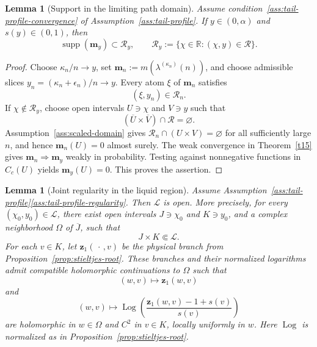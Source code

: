 \documentclass[11pt]{amsart}
\theoremstyle{plain}
\newtheorem{lemma}[theorem]{Lemma}
\numberwithin{equation}{section}
\numberwithin{theorem}{section}
\numberwithin{figure}{section}
\begin{document}
\begin{lemma}[Support in the limiting path domain]
\label{lem:limit-measure-domain-support}
Assume condition~\ref{ass:tail-profile-convergence} of
Assumption~\ref{ass:tail-profile}. If \(y\in(0,\alpha)\) and
\(s(y)\in(0,1)\), then
\[
    \operatorname{supp}(\mathbf m_y)\subset\mathcal R_y,
    \qquad
    \mathcal R_y:=\{\chi\in\mathbb R:(\chi,y)\in\mathcal R\}.
\]
\end{lemma}

\begin{proof}
Choose \(\kappa_n/n\to y\), set
\(\mathbf m_n:=m(\lambda^{(\kappa_n)}(n))\), and choose admissible
slices \(y_n=(\kappa_n+\epsilon_n)/n\to y\). Every atom \(\xi\) of
\(\mathbf m_n\) satisfies
\[
    (\xi,y_n)\in\mathcal R_n.
\]
If \(\chi\notin\mathcal R_y\), choose open intervals \(U\ni\chi\)
and \(V\ni y\) such that
\[
    (\overline U\times\overline V)\cap\mathcal R=\varnothing.
\]
Assumption~\ref{ass:scaled-domain} gives
\(\mathcal R_n\cap(U\times V)=\varnothing\) for all sufficiently
large \(n\), and hence \(\mathbf m_n(U)=0\) almost surely.
The weak convergence in Theorem~\ref{t15} gives
\(\mathbf m_n\Rightarrow\mathbf m_y\) weakly in probability.
Testing against nonnegative functions in \(C_c(U)\) yields
\(\mathbf m_y(U)=0\). This proves the assertion.
\end{proof}

\begin{lemma}[Joint regularity in the liquid region]
\label{lem:joint-liquid-regularity}
Assume
Assumption~\ref{ass:tail-profile}\ref{ass:tail-profile-regularity}.
Then \(\mathcal L\) is open. More precisely, for every
\((\chi_0,y_0)\in\mathcal L\), there exist open intervals
\(J\ni\chi_0\) and \(K\ni y_0\), and a complex neighborhood
\(\Omega\) of \(\overline J\), such that
\[
    J\times K\Subset\mathcal L.
\]
For each \(v\in K\), let
\(\mathbf z_1(\,\cdot\,,v)\) be the physical branch from
Proposition~\ref{prop:stieltjes-root}. These branches and their
normalized logarithms admit compatible holomorphic continuations to
\(\Omega\) such that
\[
    (w,v)\longmapsto\mathbf z_1(w,v)
\]
and
\[
    (w,v)\longmapsto
    \operatorname{Log}\left(
        \frac{\mathbf z_1(w,v)-1+s(v)}{s(v)}
    \right)
\]
are holomorphic in \(w\in\Omega\) and \(C^2\) in \(v\in K\), locally
uniformly in \(w\). Here \(\operatorname{Log}\) is normalized as in
Proposition~\ref{prop:stieltjes-root}.
\end{lemma}
\end{document}

